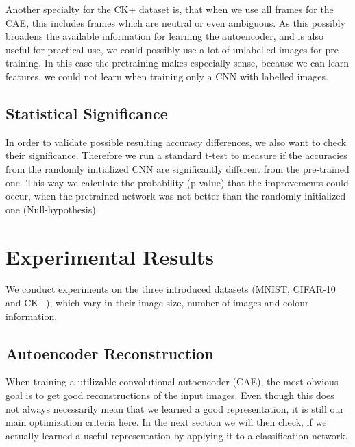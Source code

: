 \documentclass{article}
\begin{document}
      Another specialty for the CK+ dataset is, that when we use all frames for the CAE, this includes frames which are neutral or even ambiguous.
      As this possibly broadens the available information for learning the autoencoder, and is also useful for practical use, we could possibly use a lot of unlabelled images for pre-training.
      In this case the pretraining makes especially sense, because we can learn features, we could not learn when training only a CNN with labelled images.

  \subsection{Statistical Significance}
      In order to validate possible resulting accuracy differences, we also want to check their significance.
      Therefore we run a standard t-test to measure if the accuracies from the randomly initialized CNN are significantly different from the pre-trained one.
      This way we calculate the probability (p-value) that the improvements could occur, when the pretrained network was not better than the randomly initialized one (Null-hypothesis).


\section{Experimental Results}
  We conduct experiments on the three introduced datasets (MNIST, CIFAR-10 and CK+), which vary in their image size, number of images and colour information.
  
  \subsection{Autoencoder Reconstruction}

    When training a utilizable convolutional autoencoder (CAE), the most obvious goal is to get good reconstructions of the input images.
    Even though this does not always necessarily mean that we learned a good representation, it is still our main optimization criteria here.
    In the next section we will then check, if we actually learned a useful representation by applying it to a classification network.
\end{document}
